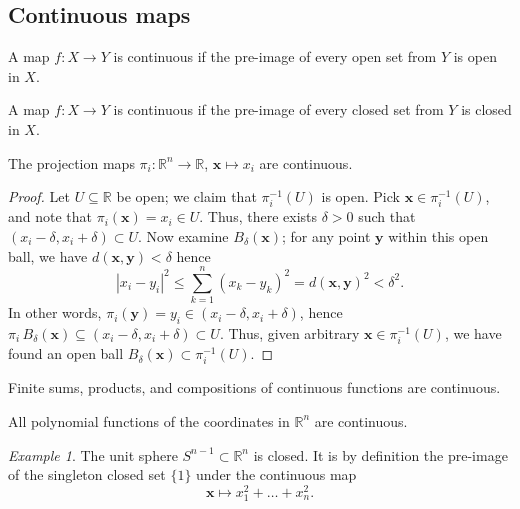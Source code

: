\documentclass[11pt]{article}
\newcommand{\R}{\mathbb{R}}
\renewcommand{\vec}[1]{\boldsymbol{#1}}
\newcommand{\vx}{\vec{x}}
\newcommand{\vy}{\vec{y}}
\theoremstyle{definition}
\theoremstyle{remark}
\newtheorem*{example}{Example}
\numberwithin{equation}{section}
\begin{document}
    \subsection{Continuous maps}
    \begin{definition}
        A map $f\colon X \to Y$ is continuous if the pre-image of every open set from
        $Y$ is open in $X$.
    \end{definition}
    \begin{lemma}
        A map $f\colon X \to Y$ is continuous if the pre-image of every closed set from
        $Y$ is closed in $X$.
    \end{lemma}

    \begin{theorem}
        The projection maps $\pi_i\colon \R^n \to \R$, $\vx \mapsto x_i$ are continuous.
    \end{theorem}
    \begin{proof}
        Let $U \subseteq \R$ be open; we claim that $\pi_i^{-1}(U)$ is open. Pick
        $\vx \in \pi_i^{-1}(U)$, and note that $\pi_i(\vx) = x_i \in U$. Thus, there
        exists $\delta > 0$ such that $(x_i - \delta, x_i + \delta) \subset U$. Now
        examine $B_\delta(\vx)$; for any point $\vy$ within this open ball, we have
        $d(\vx, \vy) < \delta$ hence \[
            |x_i - y_i|^2 \leq \sum_{k = 1}^n (x_k - y_k)^2 = d(\vx, \vy)^2 <
            \delta^2.
        \] In other words, $\pi_i(\vy) = y_i \in (x_i - \delta, x_i + \delta)$, hence
        $\pi_i \,B_\delta(\vx) \subseteq (x_i - \delta, x_i + \delta) \subset
        U$. Thus, given arbitrary $\vx \in \pi_i^{-1}(U)$, we have found an open ball
        $B_\delta(\vx) \subset \pi_i^{-1}(U)$.
    \end{proof}

    \begin{lemma}
        Finite sums, products, and compositions of continuous functions are continuous.
    \end{lemma}

    \begin{theorem}
        All polynomial functions of the coordinates in $\R^n$ are continuous.
    \end{theorem}
    \begin{example}
        The unit sphere $S^{n - 1} \subset \R^n$ is closed. It is by definition the
        pre-image of the singleton closed set $\{1\}$ under the continuous map \[
            \vx \mapsto x_1^2 + \dots + x_n^2.
        \] 
    \end{example}
    
\end{document}
